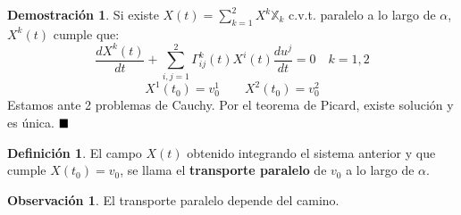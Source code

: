 \documentclass[twoside]{report}
\theoremstyle{definition}
\newtheorem{observacion}[theorem]{Observación}
\newtheorem{defi}[theorem]{Definición}
\newtheorem*{dem}{Demostración}
\newcommand*{\QED}{\hfill\ensuremath{\blacksquare}}
\numberwithin{equation}{section}
\newcommand{\X}{\mathbb{X}}
\begin{document}
\begin{dem}
Si existe $X(t) = \sum_{k=1}^2 X^k \X_k$ c.v.t. paralelo a lo largo de $α$, $X^k(t)$ cumple que:
\[ \frac{dX^k(t)}{dt} + \sum_{i,j=1}^2 Γ_{ij}^k(t) X^i(t) \frac{du^j}{dt} = 0 \quad k=1,2 \]
\[ X^1(t_0) = v_0^1  \qquad X^2(t_0) = v_0^2 \]
Estamos ante 2 problemas de Cauchy. Por el teorema de Picard, existe solución y es única.
$\QED$
\end{dem}

\begin{defi}
El campo $X(t)$ obtenido integrando el sistema anterior y que cumple $X(t_0) = v_0$, se llama el \textbf{transporte paralelo} de $v_0$ a lo largo de $α$.
\end{defi}


\begin{observacion}
El transporte paralelo depende del camino.
\end{observacion}
\end{document}
